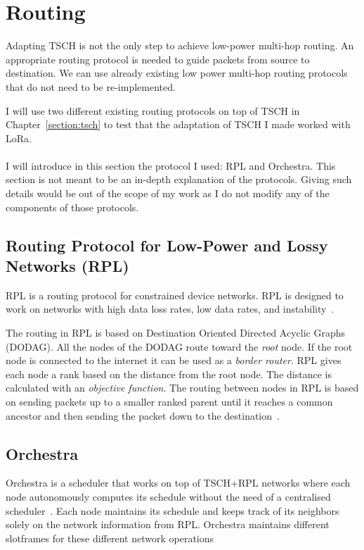 \section{Routing}

Adapting TSCH is not the only step to achieve low-power
multi-hop routing.
An appropriate routing protocol is needed to guide packets from source to destination.
We can use already existing low power multi-hop routing protocols that do not need
to be re-implemented.

I will use two different existing routing protocols on top of TSCH in
Chapter~\ref{section:tsch} to test that the adaptation of TSCH I made worked
with LoRa.

\paragraph{}

I will introduce in this section the protocol I used: RPL and Orchestra.
This section is not meant to be an in-depth explanation of the protocols.
Giving such details would be out of the scope of my work as I do not modify any
of the components of those protocols.

\subsection{Routing Protocol for Low-Power and Lossy Networks (RPL)}

RPL is a routing protocol for constrained device networks.
RPL is designed to work on networks with high data loss rates, low data rates, and
instability~\cite{rfc6550}.

The routing in RPL is based on Destination Oriented Directed Acyclic Graphs (DODAG).
All the nodes of the DODAG route toward the \emph{root} node.
If the root node is connected to the internet it can be used as a \emph{border
router}.
RPL gives each node a rank based on the distance from the root node.
The distance is calculated with an \emph{objective function}.
The routing between nodes in RPL is based on sending packets up to a smaller
ranked parent until it reaches a common ancestor and then sending the packet down
to the destination~\cite{duquennoy2015}.

\subsection{Orchestra}

Orchestra is a scheduler that works on top of TSCH+RPL
networks where each node autonomously computes its schedule without the
need of a centralised scheduler~\cite{duquennoy2015}.
Each node maintains its schedule and keeps track of its neighbors solely
on the network information from RPL.
Orchestra maintains different slotframes for these different network operations


